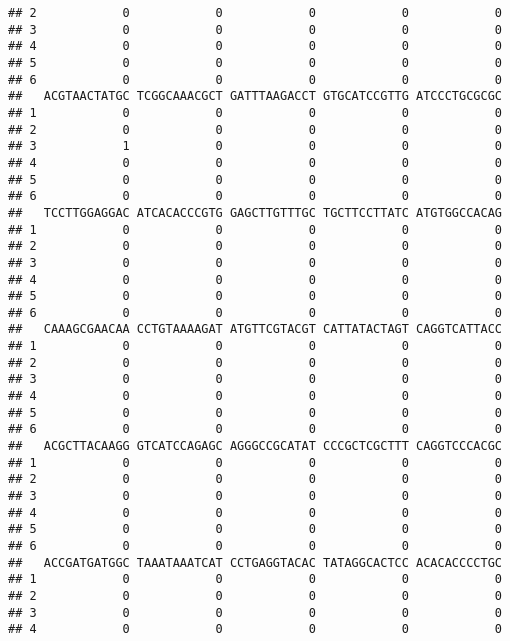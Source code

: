 \documentclass[]{article}
\begin{document}
\begin{verbatim}
## 2            0            0            0            0            0
## 3            0            0            0            0            0
## 4            0            0            0            0            0
## 5            0            0            0            0            0
## 6            0            0            0            0            0
##   ACGTAACTATGC TCGGCAAACGCT GATTTAAGACCT GTGCATCCGTTG ATCCCTGCGCGC
## 1            0            0            0            0            0
## 2            0            0            0            0            0
## 3            1            0            0            0            0
## 4            0            0            0            0            0
## 5            0            0            0            0            0
## 6            0            0            0            0            0
##   TCCTTGGAGGAC ATCACACCCGTG GAGCTTGTTTGC TGCTTCCTTATC ATGTGGCCACAG
## 1            0            0            0            0            0
## 2            0            0            0            0            0
## 3            0            0            0            0            0
## 4            0            0            0            0            0
## 5            0            0            0            0            0
## 6            0            0            0            0            0
##   CAAAGCGAACAA CCTGTAAAAGAT ATGTTCGTACGT CATTATACTAGT CAGGTCATTACC
## 1            0            0            0            0            0
## 2            0            0            0            0            0
## 3            0            0            0            0            0
## 4            0            0            0            0            0
## 5            0            0            0            0            0
## 6            0            0            0            0            0
##   ACGCTTACAAGG GTCATCCAGAGC AGGGCCGCATAT CCCGCTCGCTTT CAGGTCCCACGC
## 1            0            0            0            0            0
## 2            0            0            0            0            0
## 3            0            0            0            0            0
## 4            0            0            0            0            0
## 5            0            0            0            0            0
## 6            0            0            0            0            0
##   ACCGATGATGGC TAAATAAATCAT CCTGAGGTACAC TATAGGCACTCC ACACACCCCTGC
## 1            0            0            0            0            0
## 2            0            0            0            0            0
## 3            0            0            0            0            0
## 4            0            0            0            0            0

\end{verbatim}
\end{document}
